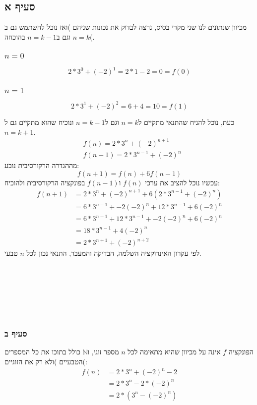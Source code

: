 \documentclass[11pt, oneside]{article}
\newcommand{\qed}{\R{$\blacksquare$}}
\newcommand{\mN}{\mathbb{N}}
\begin{document}
\subsection{סעיף א}
מכיוון שנתונים לנו שני מקרי בסיס, נרצה לבדוק את נכונות שניהם )ואז נוכל להשתמש גם ב$n = k$ וגם ב$n = k - 1$ בהוכחה(.

\subsubsection{$n = 0$}
$$2 * 3^0 + (-2)^1 = 2 * 1 - 2 = 0 = f(0)$$

\subsubsection{$n = 1$}
$$2 * 3^1 + (-2)^2 = 6 + 4 = 10 = f(1)$$

כעת, נוכל להניח שהתנאי מתקיים ל$n = k$ וגם ל$n = k - 1$ ונוכיח שהוא מתקיים גם ל$n = k + 1$.
\begin{align*}
& f(n) = 2 * 3^n + (−2)^{n+1}\\
& f(n-1) = 2 * 3^{n-1} + (-2)^n
\end{align*}
מההגדרה הרקורסיבית נובע:
$$f(n + 1) = f(n) + 6f(n-1)$$
עכשיו נוכל להציב את ערכי $f(n)$ ו$f(n-1)$ בפונקציה הרקורסיבית ולהוכיח:
\begin{align*}
f(n+1) & = 2 * 3^n + (−2)^{n+1} + 6(2 * 3^{n-1} + (-2)^n)\\
& = 6 * 3^{n-1} + -2(-2)^n + 12 * 3^{n-1} + 6(-2)^n\\
& = 6 * 3^{n-1} + 12 * 3^{n-1} + -2(-2)^n + 6(-2)^n\\
& = 18 * 3^{n-1} + 4(-2)^n\\
& = 2 * 3^{n+1} + (-2)^{n+2}
\end{align*}
לפי עקרון האינדוקציה השלמה, הבדיקה והמעבר, התנאי נכון לכל $n$ טבעי.\\\\\\\\\\\\\\
\qed

\subsubsection{סעיף ב}
הפונקציה $f$ אינה על מכיוון שהיא מתאימה לכל $n$ מספר זוגי, ו$\mN$ כולל בתוכו את כל המספרים הטבעיים )ולא רק את הזוגיים(:
\begin{align*}
f(n) & = 2 * 3^n + (-2)^n -2\\
& = 2 * 3^n - 2 * (-2)^n\\
& = 2 * (3^n - (-2)^n)
\end{align*}
\qed
\end{document}
